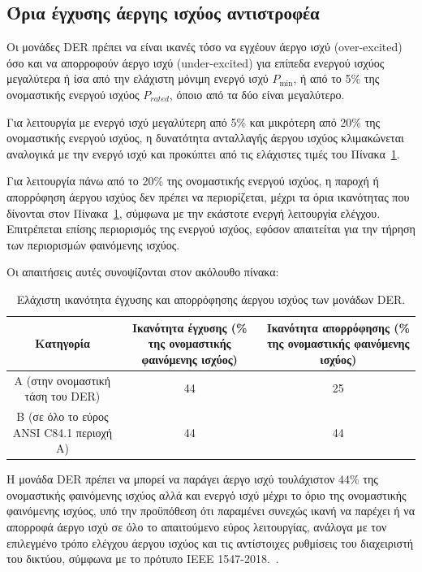 {\subsection{Όρια έγχυσης άεργης ισχύος αντιστροφέα}

Οι μονάδες \textlatin{DER} πρέπει να είναι ικανές τόσο να εγχέουν άεργο ισχύ (\textlatin{over-excited}) όσο και να απορροφούν άεργο ισχύ (\textlatin{under-excited}) για επίπεδα ενεργού ισχύος μεγαλύτερα ή ίσα από την ελάχιστη μόνιμη ενεργό ισχύ \textlatin{$P_{\min}$}, ή από το \textlatin{5\%} της ονομαστικής ενεργού ισχύος \textlatin{$P_{rated}$}, όποιο από τα δύο είναι μεγαλύτερο.

Για λειτουργία με ενεργό ισχύ μεγαλύτερη από \textlatin{5\%} και μικρότερη από \textlatin{20\%} της ονομαστικής ενεργού ισχύος, η δυνατότητα ανταλλαγής άεργου ισχύος κλιμακώνεται αναλογικά με την ενεργό ισχύ και προκύπτει από τις ελάχιστες τιμές του Πίνακα~\ref{tab:der-reactive-capability}.

Για λειτουργία πάνω από το \textlatin{20\%} της ονομαστικής ενεργού ισχύος, η παροχή ή απορρόφηση άεργου ισχύος δεν πρέπει να περιορίζεται, μέχρι τα όρια ικανότητας που δίνονται στον Πίνακα~\ref{tab:der-reactive-capability}, σύμφωνα με την εκάστοτε ενεργή λειτουργία ελέγχου. Επιτρέπεται επίσης περιορισμός της ενεργού ισχύος, εφόσον απαιτείται για την τήρηση των περιορισμών φαινόμενης ισχύος.

Οι απαιτήσεις αυτές συνοψίζονται στον ακόλουθο πίνακα:

\begin{table}[htbp!]
    \centering
    \caption{Ελάχιστη ικανότητα έγχυσης και απορρόφησης άεργου ισχύος των μονάδων \textlatin{DER}.}
    \label{tab:der-reactive-capability}
    \begin{tabular}{|c|c|c|}
        \hline
        \textbf{Κατηγορία} & \textbf{Ικανότητα έγχυσης (\% της ονομαστικής φαινόμενης ισχύος)} & \textbf{Ικανότητα απορρόφησης (\% της ονομαστικής φαινόμενης ισχύος)} \\ 
        \hline
        A (στην ονομαστική τάση του \textlatin{DER}) & 44 & 25 \\ 
        \hline
        B (σε όλο το εύρος \textlatin{ANSI C84.1} περιοχή A) & 44 & 44 \\ 
        \hline
    \end{tabular}
\end{table} 

\newpage
Η μονάδα \textlatin{DER} πρέπει να μπορεί να παράγει άεργο ισχύ τουλάχιστον $44 \%$ της ονομαστικής φαινόμενης ισχύος αλλά και ενεργό ισχύ μέχρι το όριο της ονομαστικής φαινόμενης ισχύος, υπό την προϋπόθεση ότι παραμένει συνεχώς ικανή να παρέχει ή να απορροφά άεργο ισχύ σε όλο το απαιτούμενο εύρος λειτουργίας, ανάλογα με τον επιλεγμένο τρόπο ελέγχου άεργου ισχύος και τις αντίστοιχες ρυθμίσεις του διαχειριστή του δικτύου, σύμφωνα με το πρότυπο \textlatin{IEEE 1547-2018}.~\cite{ieee1547_2018}.
 
}
